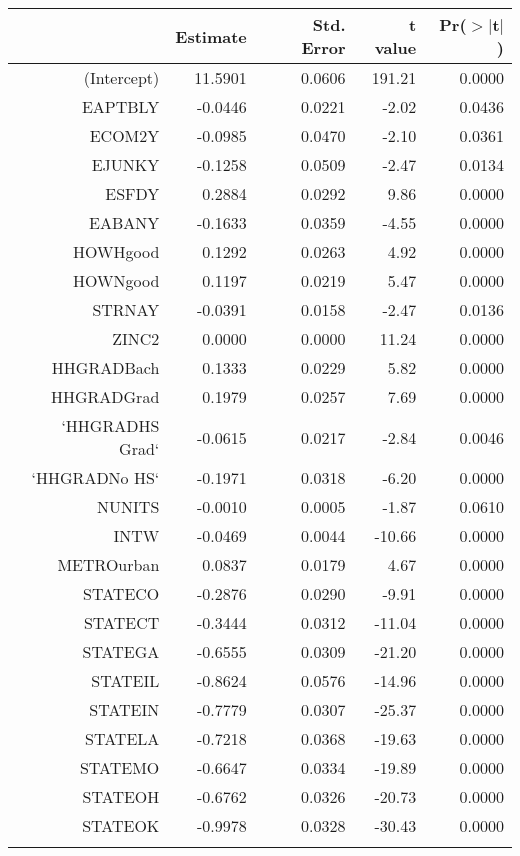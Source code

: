 \begin{table}[ht]
\centering
\begin{tabular}{rrrrr}
  \hline
 & Estimate & Std. Error & t value & Pr($>$$|$t$|$) \\ 
  \hline
(Intercept) & 11.5901 & 0.0606 & 191.21 & 0.0000 \\ 
  EAPTBLY & -0.0446 & 0.0221 & -2.02 & 0.0436 \\ 
  ECOM2Y & -0.0985 & 0.0470 & -2.10 & 0.0361 \\ 
  EJUNKY & -0.1258 & 0.0509 & -2.47 & 0.0134 \\ 
  ESFDY & 0.2884 & 0.0292 & 9.86 & 0.0000 \\ 
  EABANY & -0.1633 & 0.0359 & -4.55 & 0.0000 \\ 
  HOWHgood & 0.1292 & 0.0263 & 4.92 & 0.0000 \\ 
  HOWNgood & 0.1197 & 0.0219 & 5.47 & 0.0000 \\ 
  STRNAY & -0.0391 & 0.0158 & -2.47 & 0.0136 \\ 
  ZINC2 & 0.0000 & 0.0000 & 11.24 & 0.0000 \\ 
  HHGRADBach & 0.1333 & 0.0229 & 5.82 & 0.0000 \\ 
  HHGRADGrad & 0.1979 & 0.0257 & 7.69 & 0.0000 \\ 
  `HHGRADHS Grad` & -0.0615 & 0.0217 & -2.84 & 0.0046 \\ 
  `HHGRADNo HS` & -0.1971 & 0.0318 & -6.20 & 0.0000 \\ 
  NUNITS & -0.0010 & 0.0005 & -1.87 & 0.0610 \\ 
  INTW & -0.0469 & 0.0044 & -10.66 & 0.0000 \\ 
  METROurban & 0.0837 & 0.0179 & 4.67 & 0.0000 \\ 
  STATECO & -0.2876 & 0.0290 & -9.91 & 0.0000 \\ 
  STATECT & -0.3444 & 0.0312 & -11.04 & 0.0000 \\ 
  STATEGA & -0.6555 & 0.0309 & -21.20 & 0.0000 \\ 
  STATEIL & -0.8624 & 0.0576 & -14.96 & 0.0000 \\ 
  STATEIN & -0.7779 & 0.0307 & -25.37 & 0.0000 \\ 
  STATELA & -0.7218 & 0.0368 & -19.63 & 0.0000 \\ 
  STATEMO & -0.6647 & 0.0334 & -19.89 & 0.0000 \\ 
  STATEOH & -0.6762 & 0.0326 & -20.73 & 0.0000 \\ 
  STATEOK & -0.9978 & 0.0328 & -30.43 & 0.0000 \\ 
$$
\end{tabular}
\end{table}

